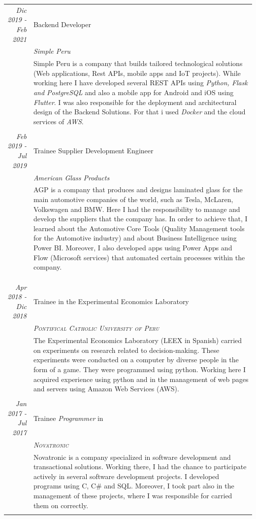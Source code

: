 \documentclass[a4paper,10pt]{article}
\begin{document}
\begin{longtable}{r|p{11cm}}
  \emph{Dic 2019 - Feb 2021} & Backend Developer \\&\emph{Simple Peru}\\&\footnotesize{Simple Peru is a company that builds tailored technological solutions (Web applications, Rest APIs, mobile apps and IoT projects). While working here I have developed several REST APIs using \emph{Python, Flask and PostgreSQL} and also a mobile app for Android and iOS using \emph{Flutter}. I was also responsible for the deployment and architectural design of the Backend Solutions. For that i used \emph{Docker} and the cloud services of \emph{AWS}.}\\&\\
  \emph{Feb 2019 - Jul 2019} & Trainee Supplier Development Engineer \\&\emph{American Glass Products}\\&\footnotesize{AGP is a company that produces and designs laminated glass for the main automotive companies of the world, such as Tesla, McLaren, Volkswagen and BMW. Here I had the responsibility to manage and develop the suppliers that the company has. In order to achieve that,  I learned about the Automotive Core Tools (Quality Management tools for the Automotive industry) and about Business Intelligence using Power BI. Moreover, I also developed apps using Power Apps and Flow (Microsoft services)  that automated certain processes within the company.}\\&\\
  \\&\\
  \emph{Apr 2018 - Dic 2018} & Trainee in the Experimental Economics Laboratory \\&\emph{\textsc{Pontifical Catholic University of Peru}}\\&\footnotesize{The Experimental Economics Laboratory (LEEX in Spanish) carried on experiments on research related to decision-making. These experiments were conducted on a computer by diverse people in the form of a game. They were programmed using python. Working here I acquired experience using python and in the management of web pages and servers using Amazon Web Services (AWS).}\\&\\
  \emph{Jan 2017 - Jul 2017} & Trainee \emph{Programmer} in \\&\emph{\textsc{Novatronic}}\\&\footnotesize{Novatronic is a company specialized in software development and transactional solutions. Working there, I had the chance to participate actively in several software development projects. I developed programs using C, C\# and SQL. Moreover, I took part also in the management of these projects, where I was responsible for carried them on correctly.}\\&\\

\end{longtable}
\end{document}
